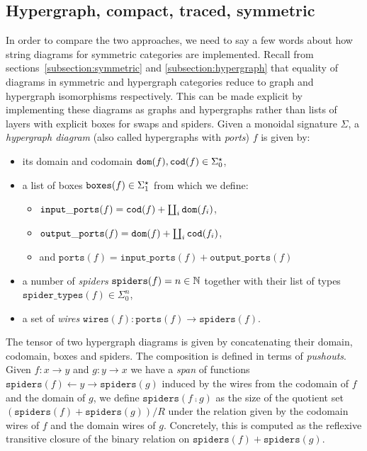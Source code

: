 \subsection{Hypergraph, compact, traced, symmetric}\label{subsection:hypergraph-diagrams}

In order to compare the two approaches, we need to say a few words about how string diagrams for symmetric categories are implemented.
Recall from sections~\ref{subsection:symmetric} and \ref{subsection:hypergraph} that equality of diagrams in symmetric and hypergraph categories reduce to graph and hypergraph isomorphisms respectively.
This can be made explicit by implementing these diagrams as graphs and hypergraphs rather than lists of layers with explicit boxes for swaps and spiders.
Given a monoidal signature $\Sigma$, a \emph{hypergraph diagram} (also called hypergraphs with \emph{ports}) $f$ is given by:
\begin{itemize}
\item its domain and codomain $\mathtt{dom}(f), \mathtt{cod}(f) \in \Sigma_0^\star$,
\item a list of boxes $\mathtt{boxes}(f) \in \Sigma_1^\star$ from which we define:
\begin{itemize}
    \item $\mathtt{input\_ports}(f) = \mathtt{cod}(f) + \coprod_i \mathtt{dom}(f_i)$,
    \item $\mathtt{output\_ports}(f) = \mathtt{dom}(f) + \coprod_i \mathtt{cod}(f_i)$,
    \item and $\mathtt{ports}(f) = \mathtt{input\_ports}(f) + \mathtt{output\_ports}(f)$
\end{itemize}
\item a number of \emph{spiders} $\mathtt{spiders}(f) = n \in \mathbb{N}$ together with their list of types $\mathtt{spider\_types}(f) \in \Sigma_0^{n}$,
\item a set of \emph{wires} $\mathtt{wires}(f) : \mathtt{ports}(f) \to \mathtt{spiders}(f)$.
\end{itemize}
The tensor of two hypergraph diagrams is given by concatenating their domain, codomain, boxes and spiders.
The composition is defined in terms of \emph{pushouts}.
Given $f : x \to y$ and $g : y \to x$ we have a \emph{span} of functions $\mathtt{spiders}(f) \leftarrow y \rightarrow \mathtt{spiders}(g)$ induced by the wires from the codomain of $f$ and the domain of $g$, we define $\mathtt{spiders}(f \fcmp g)$ as the size of the quotient set $(\mathtt{spiders}(f) + \mathtt{spiders}(g)) / R$ under the relation given by the codomain wires of $f$ and the domain wires of $g$.
Concretely, this is computed as the reflexive transitive closure of the binary relation on $\mathtt{spiders}(f) + \mathtt{spiders}(g)$.
